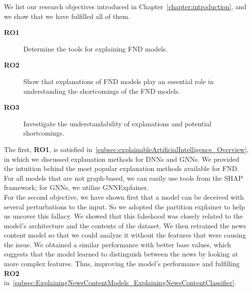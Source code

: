 We list our research objectives introduced in Chapter~\ref{chapter:introduction}, and we show that we have fulfilled all of them.
\begin{description}
    \item[\textbf{RO1}] Determine the tools for explaining FND models.
    \item[\textbf{RO2}] Show that explanations of FND models play an essential role in understanding the shortcomings of the FND models.
    \item[\textbf{RO3}] Investigate the understandability of explanations and potential shortcomings.
\end{description}
The first, \textbf{RO1}, is satisfied in~\ref{subsec:explainableArtificialIntelligence_Overview}, in which we discussed explanation methods for DNNs and GNNs. We provided the intuition behind the most popular explanation methods available for FND. For all models that are not graph-based, we can easily use tools from the SHAP framework; for GNNs, we utilize GNNExplainer. \\
For the second objective, we have shown first that a model can be deceived with several perturbations to the input. So we adopted the partition explainer to help us uncover this fallacy. We showed that this falsehood was closely related to the  model's architecture and the contents of the dataset. We then retrained the news content model so that we could analyze it without the features that were causing the issue. We obtained a similar performance with better base values, which suggests that the model learned to distinguish between the news by looking at more complex features. Thus, improving the model's performance and fulfilling \textbf{RO2} in~\ref{subsec:ExplainingNewsContentModels_ExplainingNewsContentClassifier}.\\
